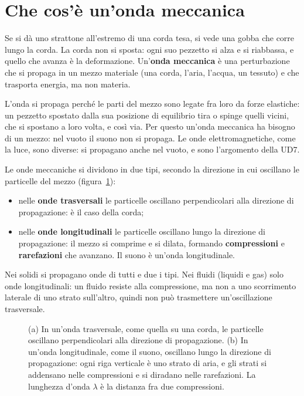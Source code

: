 \section{Che cos'è un'onda meccanica}
\label{sec:ud4-onde}

Se si dà uno strattone all'estremo di una corda tesa, si vede una gobba che corre lungo la corda. La corda non si sposta: ogni suo pezzetto si alza e si riabbassa, e quello che avanza è la deformazione. Un'\textbf{onda meccanica} è una perturbazione che si propaga in un mezzo materiale (una corda, l'aria, l'acqua, un tessuto) e che trasporta energia, ma non materia.

L'onda si propaga perché le parti del mezzo sono legate fra loro da forze elastiche: un pezzetto spostato dalla sua posizione di equilibrio tira o spinge quelli vicini, che si spostano a loro volta, e così via. Per questo un'onda meccanica ha bisogno di un mezzo: nel vuoto il suono non si propaga. Le onde elettromagnetiche, come la luce, sono diverse: si propagano anche nel vuoto, e sono l'argomento della UD7.

Le onde meccaniche si dividono in due tipi, secondo la direzione in cui oscillano le particelle del mezzo (figura~\ref{fig:ud4-tipi}):
\begin{itemize}
  \item nelle \textbf{onde trasversali} le particelle oscillano perpendicolari alla direzione di propagazione: è il caso della corda;
  \item nelle \textbf{onde longitudinali} le particelle oscillano lungo la direzione di propagazione: il mezzo si comprime e si dilata, formando \textbf{compressioni} e \textbf{rarefazioni} che avanzano. Il suono è un'onda longitudinale.
\end{itemize}
Nei solidi si propagano onde di tutti e due i tipi. Nei fluidi (liquidi e gas) solo onde longitudinali: un fluido resiste alla compressione, ma non a uno scorrimento laterale di uno strato sull'altro, quindi non può trasmettere un'oscillazione trasversale.

\begin{figure}[h]
\centering

\caption{(a) In un'onda trasversale, come quella su una corda, le particelle oscillano perpendicolari alla direzione di propagazione. (b) In un'onda longitudinale, come il suono, oscillano lungo la direzione di propagazione: ogni riga verticale è uno strato di aria, e gli strati si addensano nelle compressioni e si diradano nelle rarefazioni. La lunghezza d'onda $\lambda$ è la distanza fra due compressioni.}
\label{fig:ud4-tipi}
\end{figure}

